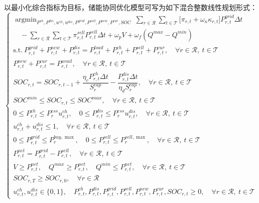 \documentclass{ctexart}
\DeclareMathOperator*{\argmin}{argmin}
\begin{document}
以最小化综合指标为目标，储能协同优化模型可写为如下混合整数线性规划形式：
\begin{equation}
\begin{cases}
\displaystyle\argmin_{P^{ch},P^{dis},u^{ch},u^{dis},P^{grid},P^{sell},P^{new},P^{cur},SOC}\ \sum_{r\in\mathcal{R}}\sum_{t\in\mathcal{T}}\big[\pi_{r,t}+\omega_{\kappa}\kappa_{r,t}\big]P^{grid}_{r,t}\Delta t\\\quad-\sum_{r\in\mathcal{R}}\sum_{t\in\mathcal{T}}\pi^{sell}_{r,t}P^{sell}_{r,t}\Delta t+\omega_pV+\omega_f(Q^{max}-Q^{min})\\\text{s.t.}\ P^{grid}_{r,t}+P^{new}_{r,t}+P^{dis}_{r,t}=P^{load}_{r,t}+P^{ch}_{r,t}+P^{sell}_{r,t}+P^{cur}_{r,t},\quad \forall r\in\mathcal{R},\ t\in\mathcal{T}\\P^{new}_{r,t}+P^{cur}_{r,t}=P^{avail}_{r,t},\quad \forall r\in\mathcal{R},\ t\in\mathcal{T}\\SOC_{r,t}=SOC_{r,t-1}+\dfrac{\eta_cP^{ch}_{r,t}\Delta t}{S^{cap}_r}-\dfrac{P^{dis}_{r,t}\Delta t}{\eta_dS^{cap}_r},\quad \forall r\in\mathcal{R},\ t\in\mathcal{T}\\SOC^{min}\le SOC_{r,t}\le SOC^{max},\quad \forall r\in\mathcal{R},\ t\in\mathcal{T}\\0\le P^{ch}_{r,t}\le P^{ess}_ru^{ch}_{r,t},\quad 0\le P^{dis}_{r,t}\le P^{ess}_ru^{dis}_{r,t},\quad \forall r\in\mathcal{R},\ t\in\mathcal{T}\\u^{ch}_{r,t}+u^{dis}_{r,t}\le 1,\quad \forall r\in\mathcal{R},\ t\in\mathcal{T}\\0\le P^{grid}_{r,t}\le P^{buy,\max}_r,\quad 0\le P^{sell}_{r,t}\le P^{sell,\max}_r,\quad \forall r\in\mathcal{R},\ t\in\mathcal{T}\\P^{net}_{r,t}=P^{grid}_{r,t}-P^{sell}_{r,t},\quad \forall r\in\mathcal{R},\ t\in\mathcal{T}\\V\ge P^{net}_{r,t},\quad Q^{max}\ge P^{net}_{r,t},\quad Q^{min}\le P^{net}_{r,t},\quad \forall r\in\mathcal{R},\ t\in\mathcal{T}\\SOC_{r,T}\ge SOC_{r,0},\quad \forall r\in\mathcal{R}\\u^{ch}_{r,t},u^{dis}_{r,t}\in\{0,1\},\quad P^{ch}_{r,t},P^{dis}_{r,t},P^{grid}_{r,t},P^{sell}_{r,t},P^{new}_{r,t},P^{cur}_{r,t},SOC_{r,t}\ge 0,\quad \forall r\in\mathcal{R},\ t\in\mathcal{T}
\end{cases}
\end{equation}
\end{document}
